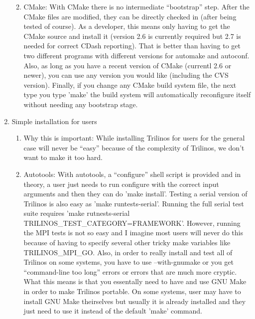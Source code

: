 \documentclass[pdf,ps2pdf,11pt]{SANDreport}
\begin{document}
\begin{enumerate}
\begin{enumerate}
  {}\item CMake: With CMake there is no intermediate ``bootstrap''
  step.  After the CMake files are modified, they can be directly
  checked in (after being tested of course).  As a developer, this
  means only having to get the CMake source and install it (version
  2.6 is currently required but 2.7 is needed for correct CDash
  reporting).  That is better than having to get two different
  programs with different versions for automake and autoconf.  Also,
  as long as you have a recent version of CMake (currentl 2.6 or
  newer), you can use any version you would like (including the CVS
  version).  Finally, if you change any CMake build system file, the
  next type you type 'make' the build system will automatically
  reconfigure itself without needing any bootstrap stage.

  \end{enumerate}

{}\item Simple installation for users

  \begin{enumerate}

  {}\item Why this is important: While installing Trilinos for users
  for the general case will never be ``easy'' because of the
  complexity of Trilinos, we don't want to make it too hard.

  {}\item Autotools: With autotools, a ``configure'' shell script is
  provided and in theory, a user just needs to run configure with the
  correct input arguments and then they can do 'make install'.
  Testing a serial version of Trilinos is also easy as 'make
  runtests-serial'.  Running the full serial test suite requires 'make
  rutnests-serial TRILINOS\_TEST\_CATEGORY=FRAMEWORK'.  However,
  running the MPI tests is not so easy and I imagine most users will
  never do this because of having to specify several other tricky make
  variables like TRILINOS\_MPI\_GO.  Also, in order to really install
  and test all of Trilinos on some systems, you have to use
  --with-gnumake or you get ``command-line too long'' errors or errors
  that are much more cryptic.  What this means is that you essentally
  need to have and use GNU Make in order to make Trilinos portable.
  On some systems, user may have to install GNU Make theirselves but
  usually it is already installed and they just need to use it instead
  of the default 'make' command.


\end{enumerate}
\end{enumerate}
\end{document}

